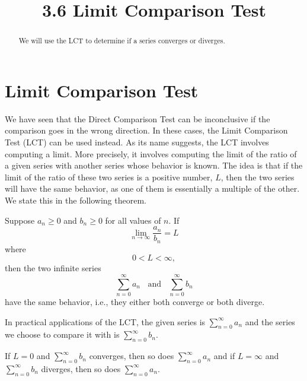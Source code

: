 \documentclass{ximera}
\title{3.6 Limit Comparison Test}
\begin{document}
\begin{abstract}
We will use the LCT to determine if a series converges or diverges.
\end{abstract}

\maketitle

\section{Limit Comparison Test}
We have seen that the Direct Comparison Test can be inconclusive if the comparison goes in the wrong direction. 
In these cases, the Limit Comparison Test (LCT) can be used instead.
As its name suggests, the LCT involves computing a limit. More precisely, it involves computing the limit of the ratio of a given series with 
another series whose behavior is known.  The idea is that if the limit of the ratio of these two series is a positive number, $L$, then the two series
will have the same behavior, as one of them is essentially a multiple of the other. We state this in the following theorem.

\begin{theorem}
Suppose $a_n \geq 0$ and $b_n \geq 0$ for all values of $n$.
If 
\[
\lim_{n \to \infty} \frac{a_n}{b_n} = L
\]
where
\[
0<L<\infty,
\]
then the two infinite series 
\[
\sum_{n=0}^\infty a_n \;\; \text{ and } \;\; \sum_{n=0}^\infty b_n
\]
have the same behavior, i.e., they either both converge or both diverge.
\end{theorem}


\begin{remark}
In practical applications of the LCT, the given series is $\displaystyle{\sum_{n=0}^\infty a_n}$
and the series we choose to compare it with is $\displaystyle{\sum_{n=0}^\infty b_n}$.
\end{remark}


\begin{remark}
If $L = 0$ and $\displaystyle{\sum_{n=0}^\infty b_n}$ converges, then so does $\displaystyle{\sum_{n=0}^\infty a_n}$
and if $L = \infty$ and $\displaystyle{\sum_{n=0}^\infty b_n}$ diverges, then so does $\displaystyle{\sum_{n=0}^\infty a_n}$.
\end{remark}
\end{document}
